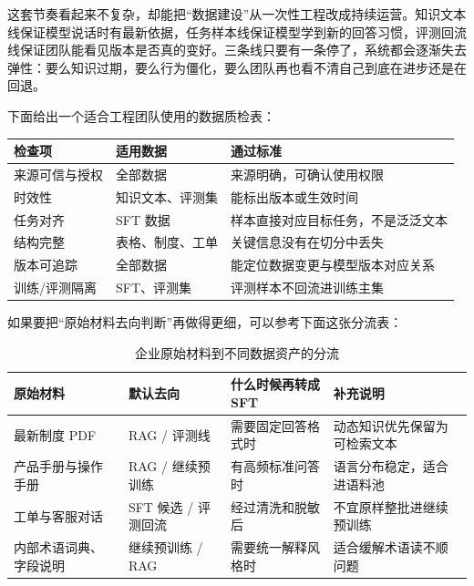这套节奏看起来不复杂，却能把“数据建设”从一次性工程改成持续运营。知识文本线保证模型说话时有最新依据，任务样本线保证模型学到新的回答习惯，评测回流线保证团队能看见版本是否真的变好。三条线只要有一条停了，系统都会逐渐失去弹性：要么知识过期，要么行为僵化，要么团队再也看不清自己到底在进步还是在回退。

下面给出一个适合工程团队使用的数据质检表：

\begin{longtable}{>{\raggedright\arraybackslash}p{3.2cm}>{\raggedright\arraybackslash}p{3.8cm}>{\raggedright\arraybackslash}p{6.2cm}}
\toprule
\textbf{检查项} & \textbf{适用数据} & \textbf{通过标准} \\
\midrule
来源可信与授权 & 全部数据 & 来源明确，可确认使用权限 \\
时效性 & 知识文本、评测集 & 能标出版本或生效时间 \\
任务对齐 & SFT 数据 & 样本直接对应目标任务，不是泛泛文本 \\
结构完整 & 表格、制度、工单 & 关键信息没有在切分中丢失 \\
版本可追踪 & 全部数据 & 能定位数据变更与模型版本对应关系 \\
训练/评测隔离 & SFT、评测集 & 评测样本不回流进训练主集 \\
\bottomrule
\end{longtable}

如果要把“原始材料去向判断”再做得更细，可以参考下面这张分流表：

\begin{table}[H]
\centering
\small
\begin{tabularx}{\textwidth}{>{\raggedright\arraybackslash}p{3cm}>{\raggedright\arraybackslash}p{3cm}>{\raggedright\arraybackslash}p{3.2cm}>{\raggedright\arraybackslash}X}
\toprule
\textbf{原始材料} & \textbf{默认去向} & \textbf{什么时候再转成 SFT} & \textbf{补充说明} \\
\midrule
最新制度 PDF & RAG / 评测线 & 需要固定回答格式时 & 动态知识优先保留为可检索文本 \\
产品手册与操作手册 & RAG / 继续预训练 & 有高频标准问答时 & 语言分布稳定，适合进语料池 \\
工单与客服对话 & SFT 候选 / 评测回流 & 经过清洗和脱敏后 & 不宜原样整批进继续预训练 \\
内部术语词典、字段说明 & 继续预训练 / RAG & 需要统一解释风格时 & 适合缓解术语读不顺问题 \\
\bottomrule
\end{tabularx}
\caption{企业原始材料到不同数据资产的分流}
\label{tab:asset-routing}
\end{table}

